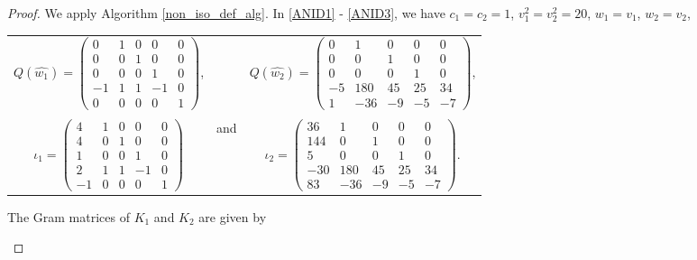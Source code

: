 \documentclass[12pt, a4paper]{article}
\newcommand{\bpm}{\begin{pmatrix}}
\newcommand{\epm}{\end{pmatrix}}
\begin{document}
\begin{proof}
  We apply Algorithm \ref{non_iso_def_alg}.
  In \ref{ANID1} - \ref{ANID3}, we have  $c_1=c_2=1$, $v_1^2=v_2^2=20$, $w_1=v_1$, $w_2 = v_2$, 
  \begin{center}
    \begin{tabular}{ccc}
      $Q(\hat{w_1}) =
      \bpm
      0 & 1 & 0 & 0 & 0 \\
      0 & 0 & 1 & 0 & 0 \\
      0 & 0 & 0 & 1 & 0 \\
      -1 & 1 & 1 & -1 & 0 \\
      0 & 0 & 0 & 0 & 1
      \epm$,
      &  &
      $Q(\hat{w_2}) =
      \bpm
      0 & 1 & 0 & 0 & 0 \\
      0 & 0 & 1 & 0 & 0 \\
      0 & 0 & 0 & 1 & 0 \\
      -5 & 180 & 45 & 25 & 34 \\
      1 & -36 & -9 & -5 & -7
      \epm$, \\
      \\
      $\iota_1 =
      \bpm
      4 & 1 & 0 & 0 & 0 \\
      4 & 0 & 1 & 0 & 0 \\
      1 & 0 & 0 & 1 & 0 \\
      2 & 1 & 1 & -1 & 0 \\
      -1 & 0 & 0 & 0 & 1
      \epm$
      & and &
      $\iota_2 =
      \bpm
      36 & 1 & 0 & 0 & 0 \\
      144 & 0 & 1 & 0 & 0 \\
      5 & 0 & 0 & 1 & 0 \\
      -30 & 180 & 45 & 25 & 34 \\
      83 & -36 & -9 & -5 & -7
      \epm$.      
    \end{tabular}
  \end{center}
  The Gram matrices of $K_1$ and $K_2$ are given by
  \begin{center}
\end{center}
\end{proof}
\end{document}
